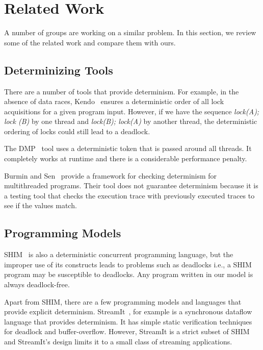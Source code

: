 \documentclass[10pt, conference, compsocconf]{IEEEtran}
\begin{document}
\section{Related Work}
\label{sec:related}

A number of groups are working on a similar problem.
In this section, we review some of the related work
and compare them with ours.
 
\subsection{Determinizing Tools} 
 
There are a number of tools that provide determinism. For example, 
in the absence of data races, Kendo~\cite{olszewski2009kendo} ensures 
a deterministic order of all lock acquisitions for a given program input. 
However, if we have the sequence \emph{lock(A); lock (B)} by one thread 
and \emph{lock(B); lock(A)} by another thread, the deterministic ordering 
of locks could still lead to a deadlock. 
 
The DMP~\cite{devietti2009dmp} tool uses a deterministic token that is passed around all threads.  It completely works at runtime and there is a considerable performance penalty. 
 
Burmin and Sen~\cite{Burnim2009asserting} provide a framework for checking determinism for 
multithreaded programs. Their tool does not  
 guarantee determinism because it is a testing tool 
that checks the execution trace  with previously executed 
traces to see if the values match. 

\subsection{Programming Models} 
 
SHIM~\cite{edwards2005shim2,tardieu2006scheduling-independent} is also
a deterministic concurrent programming language, but the improper use
of its constructs leads to problems such as deadlocks i.e., a SHIM program
may be susceptible to deadlocks. Any program written in our model is always
deadlock-free.
 
Apart from SHIM, there are  a few programming models and languages 
that provide explicit determinism. StreamIt~\cite{thies2001streamit}, for 
example is a synchronous dataflow language that provides determinism. It 
has simple static verification techniques for deadlock and buffer-overflow. 
However, StreamIt is a strict subset of SHIM and StreamIt's design 
limits it to a small class of streaming applications. 
 
\end{document}
